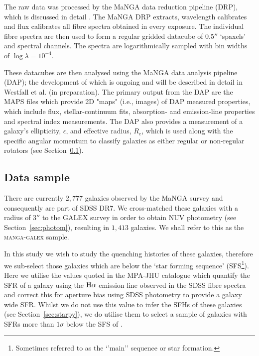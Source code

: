 \documentclass[useAMS,usenatbib]{mn2e}
\begin{document}
The raw data was processed by the MaNGA data reduction pipeline (DRP), which is discussed in detail \cite{law16}. The MaNGA DRP extracts, wavelength calibrates and flux calibrates all fibre spectra obtained in every exposure. The individual fibre spectra are then used to form a regular gridded datacube of $0.5''$ ‘spaxels’ and spectral channels. The spectra are logarithmically sampled with bin widths of $\log{\lambda} = 10^{-4}$. 

These datacubes are then analysed using the MaNGA data analysis pipeline (DAP); the development of which is ongoing and will be described in detail in Westfall et al. (in preparation). The primary output from the DAP are the MAPS files which provide 2D "maps" (i.e., images) of DAP measured properties, which include flux, stellar-continuum fits, absorption- and emission-line properties and spectral index measurements. The DAP also provides a measurement of a galaxy's ellipticity, $\epsilon$, and effective radius, $R_e$, which is used along with the specific angular momentum to classify galaxies as either regular or non-regular rotators (see Section~\ref{sec:mangasample}). 

\subsection{Data sample}\label{sec:mangasample}

There are currently $2,777$ galaxies observed by the MaNGA survey and consequently are part of SDSS DR7. We cross-matched these galaxies with a radius of $3''$ to the GALEX survey in order to obtain NUV photometry (see Section~\ref{sec:photom}), resulting in $1,413$ galaxies. We shall refer to this as the \textsc{manga-galex} sample. 

In this study we wish to study the quenching histories of these galaxies, therefore we sub-select those galaxies which are below the `star forming sequence' (SFS\footnote{Sometimes referred to as the `'main'' sequence or star formation.}). Here we utilise the values quoted in the MPA-JHU catalogue \citep{kauffmann03, brinchmann04} which quantify the SFR of a galaxy using the $\rm{H}\alpha$ emission line observed in the SDSS fibre spectra and correct this for aperture bias using SDSS photometry to provide a galaxy wide SFR. Whilst we do not use this value to infer the SFHs of these galaxies (see Section~\ref{sec:starpy}), we do utilise them to select a sample of galaxies with SFRs more than $1\sigma$ below the SFS of \cite{peng10}. 
\end{document}
